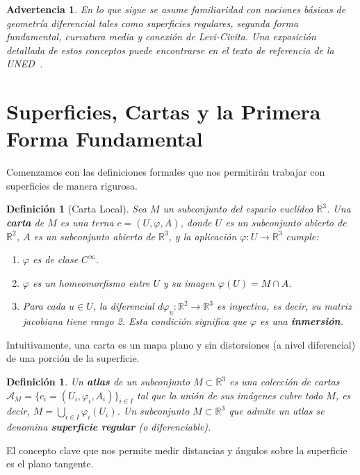\documentclass[12pt, a4paper]{report}
\theoremstyle{miestilo}
\theoremstyle{midefinicion}
\newtheorem{definicion}[teorema]{Definición}
\newtheorem{advertencia}[teorema]{Advertencia}
\begin{document}
\begin{advertencia}
En lo que sigue se asume familiaridad con nociones básicas de geometría diferencial tales como superficies regulares, segunda forma fundamental, curvatura media y conexión de Levi-Civita. Una exposición detallada de estos conceptos puede encontrarse en el texto de referencia de la UNED~\cite{costa}.
\end{advertencia}

\section{Superficies, Cartas y la Primera Forma Fundamental}

Comenzamos con las definiciones formales que nos permitirán trabajar con superficies de manera rigurosa.

\begin{definicion}[Carta Local]
Sea $M$ un subconjunto del espacio euclídeo $\mathbb{R}^3$. Una \textbf{carta} de $M$ es una terna $c = (U, \varphi, A)$, donde $U$ es un subconjunto abierto de $\mathbb{R}^2$, $A$ es un subconjunto abierto de $\mathbb{R}^3$, y la aplicación $\varphi: U \to \mathbb{R}^3$ cumple:
\begin{enumerate}
    \item $\varphi$ es de clase $C^\infty$.
    \item $\varphi$ es un homeomorfismo entre $U$ y su imagen $\varphi(U) = M \cap A$.
    \item Para cada $u \in U$, la diferencial $d\varphi_u: \mathbb{R}^2 \to \mathbb{R}^3$ es inyectiva, es decir, su matriz jacobiana tiene rango 2. Esta condición significa que $\varphi$ es una \textbf{inmersión}.
\end{enumerate}
\end{definicion}

Intuitivamente, una carta es un mapa plano y sin distorsiones (a nivel diferencial) de una porción de la superficie.

\begin{definicion}
Un \textbf{atlas} de un subconjunto $M \subset \mathbb{R}^3$ es una colección de cartas $\mathcal{A}_M = \{c_i = (U_i, \varphi_i, A_i)\}_{i \in I}$ tal que la unión de sus imágenes cubre todo $M$, es decir, $M = \bigcup_{i \in I} \varphi_i(U_i)$. Un subconjunto $M \subset \mathbb{R}^3$ que admite un atlas se denomina \textbf{superficie regular} (o diferenciable).
\end{definicion}

El concepto clave que nos permite medir distancias y ángulos sobre la superficie es el plano tangente.
\end{document}
